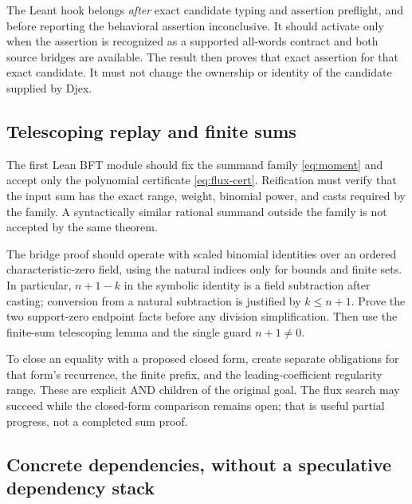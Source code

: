 The Leant hook belongs \emph{after} exact candidate typing and assertion preflight, and before reporting the behavioral assertion inconclusive. It should activate only when the assertion is recognized as a supported all-words contract and both source bridges are available. The result then proves that exact assertion for that exact candidate. It must not change the ownership or identity of the candidate supplied by Djex.

\subsection{Telescoping replay and finite sums}

The first Lean BFT module should fix the summand family \eqref{eq:moment} and accept only the polynomial certificate \eqref{eq:flux-cert}. Reification must verify that the input sum has the exact range, weight, binomial power, and casts required by the family. A syntactically similar rational summand outside the family is not accepted by the same theorem.

The bridge proof should operate with scaled binomial identities over an ordered characteristic-zero field, using the natural indices only for bounds and finite sets. In particular, $n+1-k$ in the symbolic identity is a field subtraction after casting; conversion from a natural subtraction is justified by $k\le n+1$. Prove the two support-zero endpoint facts before any division simplification. Then use the finite-sum telescoping lemma and the single guard $n+1\ne0$.

To close an equality with a proposed closed form, create separate obligations for that form's recurrence, the finite prefix, and the leading-coefficient regularity range. These are explicit AND children of the original goal. The flux search may succeed while the closed-form comparison remains open; that is useful partial progress, not a completed sum proof.

\subsection{Concrete dependencies, without a speculative dependency stack}

